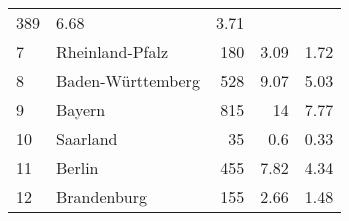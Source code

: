 \begin{longtable}{lXrrr}
       \num{389} &
       \num[round-mode=places,round-precision=2]{6.68} &
         \num[round-mode=places,round-precision=2]{3.71} \\

     7 &
     \multicolumn{1}{X}{ Rheinland-Pfalz   } &


       \num{180} &
       \num[round-mode=places,round-precision=2]{3.09} &
         \num[round-mode=places,round-precision=2]{1.72} \\

     8 &
     \multicolumn{1}{X}{ Baden-Württemberg   } &


       \num{528} &
       \num[round-mode=places,round-precision=2]{9.07} &
         \num[round-mode=places,round-precision=2]{5.03} \\

     9 &
     \multicolumn{1}{X}{ Bayern   } &


       \num{815} &
       \num[round-mode=places,round-precision=2]{14} &
         \num[round-mode=places,round-precision=2]{7.77} \\

     10 &
     \multicolumn{1}{X}{ Saarland   } &


       \num{35} &
       \num[round-mode=places,round-precision=2]{0.6} &
         \num[round-mode=places,round-precision=2]{0.33} \\

     11 &
     \multicolumn{1}{X}{ Berlin   } &


       \num{455} &
       \num[round-mode=places,round-precision=2]{7.82} &
         \num[round-mode=places,round-precision=2]{4.34} \\

     12 &
     \multicolumn{1}{X}{ Brandenburg   } &


       \num{155} &
       \num[round-mode=places,round-precision=2]{2.66} &
         \num[round-mode=places,round-precision=2]{1.48} \\


\end{longtable}
